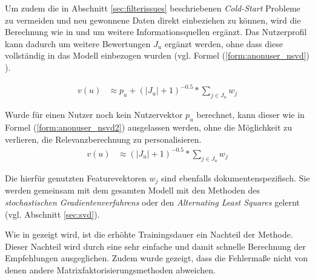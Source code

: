 Um zudem die in Abschnitt \ref{sec:filterissues} beschriebenen \textit{Cold-Start} Probleme zu vermeiden und neu gewonnene Daten direkt einbeziehen zu können, wird die Berechnung wie in \citep{Paterek07} und \citep{Koren:2009:MFT:1608565.1608614} um weitere Informationsquellen ergänzt. Das Nutzerprofil kann dadurch um weitere Bewertungen $J_u$ ergänzt werden, ohne dass diese vollständig in das Modell einbezogen wurden (vgl. Formel (\ref{form:anonuser_nsvd}) ).

\begin{align}
v(u) & \approx p_u  +(|J_u|+1)^{-0.5}*\sum_{j \in J_u} w_{j} \label{form:anonuser_nsvd}
\end{align}

Wurde für einen Nutzer noch kein Nutzervektor $p_u$ berechnet, kann dieser wie in Formel (\ref{form:anonuser_nsvd2}) ausgelassen werden, ohne die Möglichkeit zu verlieren, die Relevanzberechnung zu personalisieren.
\begin{align}
v(u) & \approx (|J_u|+1)^{-0.5}*\sum_{j \in J_u} w_{j} \label{form:anonuser_nsvd2}
\end{align}

Die hierfür genutzten Featurevektoren $w_j$ sind ebenfalls dokumentenspezifisch. Sie werden gemeinsam mit dem gesamten Modell mit den Methoden des \textit{stochastischen Gradientenverfahrens} oder den \textit{Alternating Least Squares} gelernt (vgl. Abschnitt \ref{sec:svd}).  \citep{Paterek07,Koren:2009:MFT:1608565.1608614}

Wie in \citep{Cacheda2011} gezeigt wird, ist die erhöhte Trainingsdauer ein Nachteil der Methode. Dieser Nachteil wird durch eine sehr einfache und damit schnelle Berechnung der Empfehlungen ausgeglichen. Zudem wurde gezeigt, dass die Fehlermaße nicht von denen andere Matrixfaktorisierungsmethoden abweichen. \citep{Cacheda2011}
 \newpage
